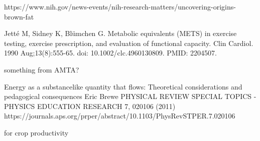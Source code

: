 \documentclass[12pt]{iopart}
\begin{document}
\begin{thebibliography}{99}
https://www.nih.gov/news-events/nih-research-matters/uncovering-origins-brown-fat

Jetté M, Sidney K, Blümchen G. Metabolic equivalents (METS) in exercise testing, exercise prescription, and evaluation of functional capacity. Clin Cardiol. 1990 Aug;13(8):555-65. doi: 10.1002/clc.4960130809. PMID: 2204507.

something from AMTA?

Energy as a substancelike quantity that flows: Theoretical considerations
and pedagogical consequences
Eric Brewe
PHYSICAL REVIEW SPECIAL TOPICS - PHYSICS EDUCATION RESEARCH 7, 020106 (2011)
https://journals.aps.org/prper/abstract/10.1103/PhysRevSTPER.7.020106


 for crop productivity


\end{thebibliography}
\end{document}

